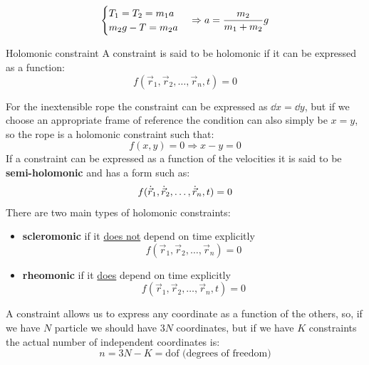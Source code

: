 \begin{equation}
    \centering
\begin{cases}
T_1=T_2=m_1a \\
m_2g -T =m_2a \\
\end{cases} \Rightarrow a = \dfrac{m_2}{m_1+m_2}g
\end{equation}
\begin{definition}{Holomonic constraint}
  A constraint is said to be holomonic if it can be expressed as a function:
  \begin{equation}
    f(\vec{r}_1,\vec{r}_2,\dots,\vec{r}_n,t) = 0
  \end{equation}
\end{definition}
For the inextensible rope the constraint can be expressed as $\dd{x}=\dd{y}$, but if we choose an appropriate frame of reference the condition can also simply be $x=y$, so the rope is a holomonic constraint such that:
\begin{equation}
    f(x,y)=0 \Rightarrow x-y=0
\end{equation}
If a constraint can be expressed as a function of the velocities it is said to be \textbf{semi-holomonic} and has a form such as:
\begin{equation}
    f(\dot{\vec{r}}_1,\dot{\vec{r}}_2,\dots,\dot{\vec{r}}_n,t) = 0
\end{equation}
There are two main types of holomonic constraints:
\begin{itemize}
    \item \textbf{scleromonic} if it \underline{does not} depend on time explicitly \[f(\vec{r}_1,\vec{r}_2,\dots,\vec{r}_n) = 0\]
    \item \textbf{rheomonic} if it \underline{does} depend on time explicitly \[f(\vec{r}_1,\vec{r}_2,\dots,\vec{r}_n,t) = 0\]
\end{itemize}
A constraint allows us to express any coordinate as a function of the others, so, if we have $N$ particle we should have $3N$ coordinates, but if we have $K$ constraints the actual number of independent coordinates is:
\begin{equation}
    n = 3N-K = \text{dof (degrees of freedom)}
\end{equation}
